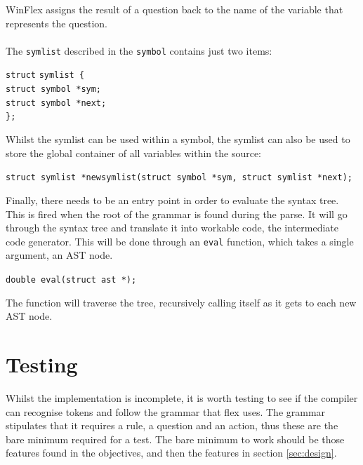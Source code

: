 \documentclass[12pt]{report}
\begin{document}
WinFlex assigns the result of a question back to the name of the variable that represents the question.\\
\\
The \texttt{symlist} described in the \texttt{symbol} contains just two items:\\
\begin{tabbing}
	\texttt{struct} \= \texttt{symlist \{}\\
	\> \texttt{struct symbol *sym;}\\
	\> \texttt{struct symbol *next;}\\
	\texttt{\};}\\
\end{tabbing}
Whilst the symlist can be used within a symbol, the symlist can also be used to store the global container of all variables within the source:\\
\begin{center}
	\texttt{struct symlist *newsymlist(struct symbol *sym, struct symlist *next);}\\
\end{center}
Finally, there needs to be an entry point in order to evaluate the syntax tree.  This is fired when the root of the grammar is found during the parse.  It will go through the syntax tree and translate it into workable code, the intermediate code generator.  This will be done through an \texttt{eval} function, which takes a single argument, an AST node.\\
\begin{center}
	\texttt{double eval(struct ast *);}\\
\end{center}
The function will traverse the tree, recursively calling itself as it gets to each new AST node.
\chapter{Testing}
Whilst the implementation is incomplete, it is worth testing to see if the compiler can recognise tokens and follow the grammar that flex uses.  The grammar stipulates that it requires a rule, a question and an action, thus these are the bare minimum required for a test.  The bare minimum to work should be those features found in the objectives, and then the features in section \ref{sec:design}.\\
\\
\end{document}
